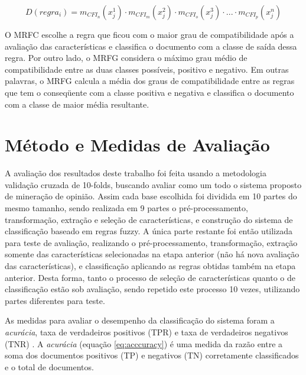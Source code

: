 \begin{equation}
D(regra_i) = m_{CFI_n}(x_j^1) \cdot m_{CFI_m}(x_j^2) \cdot m_{CFI_o}(x_j^3) \cdot ...\cdot m_{CFI_p}(x_j^n)
\label{eq:compat_regra}
\end{equation}

O MRFC escolhe a regra que ficou com o maior grau de compatibilidade após a avaliação das características e classifica o documento com a classe de saída dessa regra.  Por outro lado, o MRFG considera o máximo grau médio de compatibilidade entre as duas classes possíveis, positivo e negativo. Em outras palavras, o MRFG calcula a média dos graus de compatibilidade entre as regras que tem o conseqüente com a classe positiva e negativa e classifica o documento com a classe de maior média resultante. 

\section{Método e Medidas de Avaliação}

A avaliação dos resultados deste trabalho foi feita usando a metodologia validação cruzada de 10-folds, buscando avaliar como um todo o sistema proposto de mineração de opinião. Assim cada base escolhida foi dividida em 10 partes do mesmo tamanho, sendo realizada em 9 partes o pré-processamento, transformação, extração e seleção de características, e construção do sistema de classificação baseado em regras fuzzy. A única parte restante foi então utilizada para teste de avaliação, realizando o pré-processamento, transformação,  extração somente das características selecionadas na etapa anterior (não há nova avaliação das características), e classificação aplicando as regras obtidas também na etapa anterior. Desta forma, tanto o processo de seleção de características quanto o de classificação estão sob avaliação, sendo repetido este processo 10 vezes, utilizando partes diferentes para teste.


As medidas para avaliar o desempenho da classificação do sistema foram a \textit{acurácia}, taxa de verdadeiros positivos (TPR) e taxa de verdadeiros negativos (TNR) \cite{garcia2012multi}. A \textit{acurácia} (equação \ref{eq:acccuracy}) é uma medida da razão entre a soma dos documentos positivos (TP) e negativos (TN) corretamente classificados e o total de documentos.

